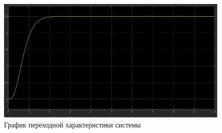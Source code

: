 \documentclass[a4paper, 12pt]{article}
\begin{document}
    \begin{figure}[H]
        \centering
        \includegraphics[scale=0.3]{task_2_A.jpg}
        \captionsetup{skip=0pt}
        \caption{График переходной характеристики системы}
        \label{fig:2A}
    \end{figure}
\end{document}
